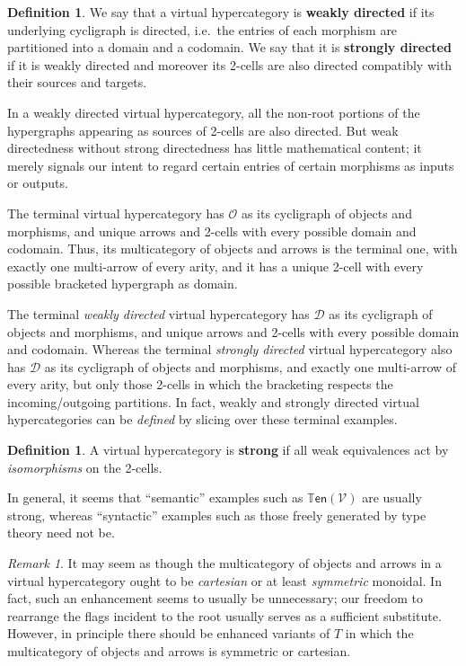 \documentclass{article}
\theoremstyle{definition}
\newtheorem{defn}[thm]{Definition}
\theoremstyle{remark}
\newtheorem{rmk}[thm]{Remark}
\def\V{\mathscr{V}}
\def\ten{\mathbb{T}\mathsf{en}}
\def\thy{\mathcal{O}}
\def\dhy{\mathcal{D}}
\begin{document}
\begin{defn}\label{thm:wk-dir}
  We say that a virtual hypercategory is \textbf{weakly directed} if its underlying cycligraph is directed, i.e.\ the entries of each morphism are partitioned into a domain and a codomain.
  We say that it is \textbf{strongly directed} if it is weakly directed and moreover its 2-cells are also directed compatibly with their sources and targets.
\end{defn}

In a weakly directed virtual hypercategory, all the non-root portions of the hypergraphs appearing as sources of 2-cells are also directed.
But weak directedness without strong directedness has little mathematical content; it merely signals our intent to regard certain entries of certain morphisms as inputs or outputs.

The terminal virtual hypercategory has $\thy$ as its cycligraph of objects and morphisms, and unique arrows and 2-cells with every possible domain and codomain.
Thus, its multicategory of objects and arrows is the terminal one, with exactly one multi-arrow of every arity, and it has a unique 2-cell with every possible bracketed hypergraph as domain.

The terminal \emph{weakly directed} virtual hypercategory has $\dhy$ as its cycligraph of objects and morphisms, and unique arrows and 2-cells with every possible domain and codomain.
Whereas the terminal \emph{strongly directed} virtual hypercategory also has $\dhy$ as its cycligraph of objects and morphisms, and exactly one multi-arrow of every arity, but only those 2-cells in which the bracketing respects the incoming/outgoing partitions.
In fact, weakly and strongly directed virtual hypercategories can be \emph{defined} by slicing over these terminal examples.

\begin{defn}\label{thm:strong}
  A virtual hypercategory is \textbf{strong} if all weak equivalences act by \emph{isomorphisms} on the 2-cells.
\end{defn}

In general, it seems that ``semantic'' examples such as $\ten(\V)$ are usually strong, whereas ``syntactic'' examples such as those freely generated by type theory need not be.

\begin{rmk}
  It may seem as though the multicategory of objects and arrows in a virtual hypercategory ought to be \emph{cartesian} or at least \emph{symmetric} monoidal.
  In fact, such an enhancement seems to usually be unnecessary; our freedom to rearrange the flags incident to the root usually serves as a sufficient substitute.
  However, in principle there should be enhanced variants of $T$ in which the multicategory of objects and arrows is symmetric or cartesian.
\end{rmk}
\end{document}
